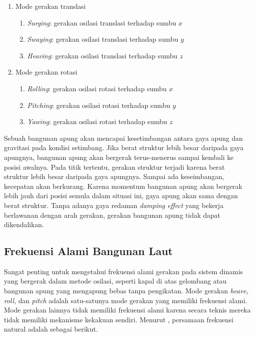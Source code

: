 \begin{enumerate}
    \item Mode gerakan translasi
    \begin{enumerate}[label=\alph*.]
        \item \textit{Surging}: gerakan osilasi translasi terhadap sumbu $x$
        \item \textit{Swaying}: gerakan osilasi translasi terhadap sumbu $y$
        \item \textit{Heaving}: gerakan osilasi translasi terhadap sumbu $z$
    \end{enumerate}

    \item Mode gerakan rotasi
    \begin{enumerate}[label=\alph*.]
        \item \textit{Rolling}: gerakan osilasi rotasi terhadap sumbu $x$
        \item \textit{Pitching}: gerakan osilasi rotasi terhadap sumbu $y$
        \item \textit{Yawing}: gerakan osilasi rotasi terhadap sumbu $z$
    \end{enumerate}
\end{enumerate}

Sebuah bangunan apung akan mencapai kesetimbangan antara gaya apung dan gravitasi pada kondisi setimbang. Jika berat struktur lebih besar daripada gaya apungnya, bangunan apung akan bergerak terus-menerus sampai kembali ke posisi awalnya.
Pada titik tertentu, gerakan struktur terjadi karena berat struktur lebih besar daripada gaya apungnya. Sampai ada keseimbangan, kecepatan akan berkurang. Karena momentum bangunan apung akan bergerak lebih jauh dari posisi semula dalam situasi ini, gaya apung akan sama dengan berat struktur. Tanpa adanya gaya redaman \textit{damping effect} yang bekerja berlawanan dengan arah gerakan, gerakan bangunan apung tidak dapat dikendalikan.


\subsection{Frekuensi Alami Bangunan Laut}
\label{subsec:frekuensi-alami-kapal}

Sangat penting untuk mengetahui frekuensi alami gerakan pada sistem dinamis yang bergerak dalam metode osilasi, seperti kapal di atas gelombang atau bangunan apung yang mengapung bebas tanpa pengikatan. Mode gerakan \emph{heave, roll,} dan \textit{pitch} adalah satu-satunya mode gerakan yang memiliki frekuensi alami. Mode gerakan lainnya tidak memiliki frekuensi alami karena secara teknis mereka tidak memiliki mekanisme kekakuan sendiri. Menurut \citep{Djatmiko_2012}, persamaan frekuensi natural adalah sebagai berikut.


